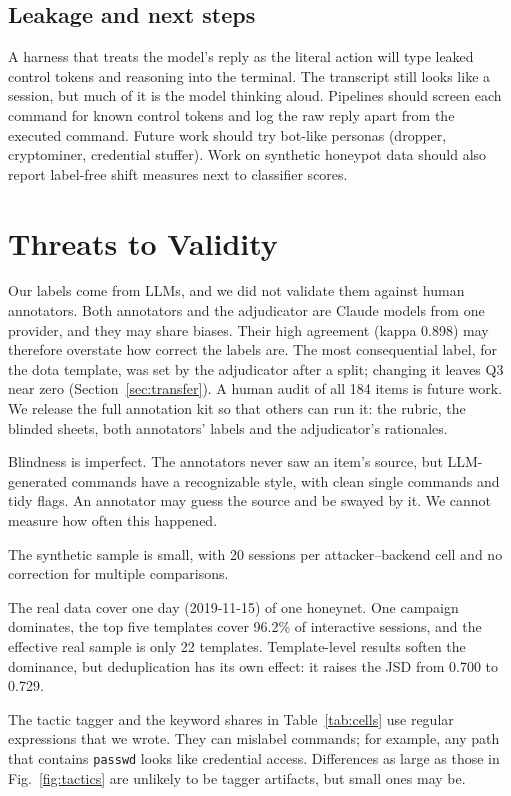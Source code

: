 \documentclass[conference]{IEEEtran}
\newcommand{\cmd}[1]{\texttt{#1}}
\begin{document}
\subsection{Leakage and next steps}
A harness that treats the model's reply as the literal action will type leaked control tokens and reasoning into the terminal. The transcript still looks like a session, but much of it is the model thinking aloud. Pipelines should screen each command for known control tokens and log the raw reply apart from the executed command. Future work should try bot-like personas (dropper, cryptominer, credential stuffer). Work on synthetic honeypot data should also report label-free shift measures next to classifier scores.

\section{Threats to Validity}\label{sec:threats}

Our labels come from LLMs, and we did not validate them against human annotators. Both annotators and the adjudicator are Claude models from one provider, and they may share biases. Their high agreement (kappa 0.898) may therefore overstate how correct the labels are. The most consequential label, for the dota template, was set by the adjudicator after a split; changing it leaves Q3 near zero (Section~\ref{sec:transfer}). A human audit of all 184 items is future work. We release the full annotation kit so that others can run it: the rubric, the blinded sheets, both annotators' labels and the adjudicator's rationales.

Blindness is imperfect. The annotators never saw an item's source, but LLM-generated commands have a recognizable style, with clean single commands and tidy flags. An annotator may guess the source and be swayed by it. We cannot measure how often this happened.

The synthetic sample is small, with 20 sessions per attacker--backend cell and no correction for multiple comparisons.

The real data cover one day (2019-11-15) of one honeynet. One campaign dominates, the top five templates cover 96.2\% of interactive sessions, and the effective real sample is only 22 templates. Template-level results soften the dominance, but deduplication has its own effect: it raises the JSD from 0.700 to 0.729.

The tactic tagger and the keyword shares in Table~\ref{tab:cells} use regular expressions that we wrote. They can mislabel commands; for example, any path that contains \cmd{passwd} looks like credential access. Differences as large as those in Fig.~\ref{fig:tactics} are unlikely to be tagger artifacts, but small ones may be.
\end{document}
